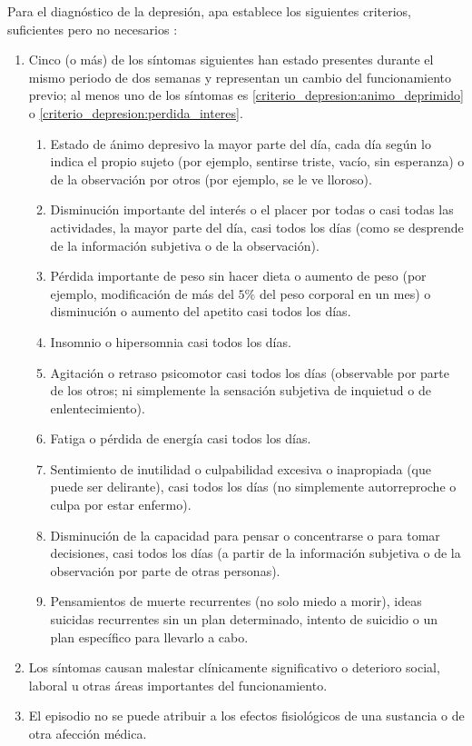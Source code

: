        Para el diagnóstico de la depresión, \gls{apa} establece los siguientes criterios, suficientes pero no necesarios \cite{american_psychological_association_manual_2014}:
        \begin{enumerate}[label={\alph*.}]
            \item Cinco (o más) de los síntomas siguientes han estado presentes durante el mismo periodo de dos semanas y representan un cambio del funcionamiento previo; al menos uno de los síntomas es \ref{criterio_depresion:animo_deprimido} o \ref{criterio_depresion:perdida_interes}. 
                \begin{enumerate}[label={\arabic*.}]
                    \item \label{criterio_depresion:animo_deprimido} Estado de ánimo depresivo la mayor parte del día, cada día según lo indica el propio sujeto (por ejemplo, sentirse triste, vacío, sin esperanza) o de la observación por otros (por ejemplo, se le ve lloroso).
                    \item \label{criterio_depresion:perdida_interes} Disminución importante del interés o el placer por todas o casi todas las actividades, la mayor parte del día, casi todos los días (como se desprende de la información subjetiva o de la observación).
                    \item Pérdida importante de peso sin hacer dieta o aumento de peso (por ejemplo, modificación de más del $5\%$ del peso corporal en un mes) o disminución o aumento del apetito casi todos los días. 
                    \item Insomnio o hipersomnia casi todos los días.
                    \item Agitación o retraso psicomotor casi todos los días (observable por parte de los otros; ni simplemente la sensación subjetiva de inquietud o de enlentecimiento).
                    \item Fatiga o pérdida de energía casi todos los días.
                    \item Sentimiento de inutilidad o culpabilidad excesiva o inapropiada (que puede ser delirante), casi todos los días (no simplemente autorreproche o culpa por estar enfermo).
                    \item Disminución de la capacidad para pensar o concentrarse o para tomar decisiones, casi todos los días (a partir de la información subjetiva o de la observación por parte de otras personas).
                    \item Pensamientos de muerte recurrentes (no solo miedo a morir), ideas suicidas recurrentes sin un plan determinado, intento de suicidio o un plan específico para llevarlo a cabo.
                \end{enumerate}
            \item Los síntomas causan malestar clínicamente significativo o deterioro social, laboral u otras áreas importantes del funcionamiento.
            \item El episodio no se puede atribuir a los efectos fisiológicos de una sustancia o de otra afección médica.
        \end{enumerate}
